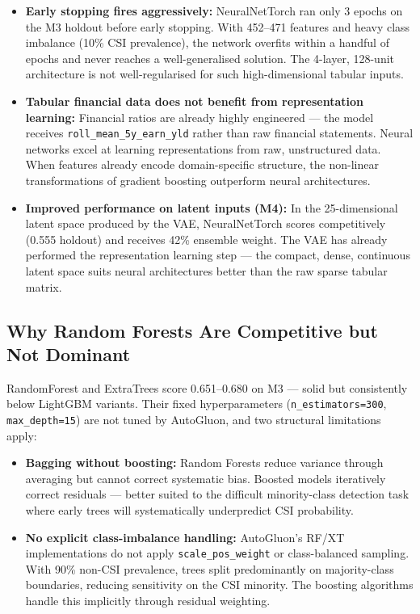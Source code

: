 \documentclass{report}\usepackage[]{graphicx}\usepackage[table]{xcolor}
\begin{document}
\begin{itemize}
    \item \textbf{Early stopping fires aggressively:} NeuralNetTorch ran only
    3 epochs on the M3 holdout before early stopping. With 452--471 features
    and heavy class imbalance (10\% CSI prevalence), the network overfits
    within a handful of epochs and never reaches a well-generalised solution.
    The 4-layer, 128-unit architecture is not well-regularised for such
    high-dimensional tabular inputs.

    \item \textbf{Tabular financial data does not benefit from representation learning:}
    Financial ratios are already highly engineered — the model receives
    \texttt{roll\_mean\_5y\_earn\_yld} rather than raw financial statements.
    Neural networks excel at learning representations from raw, unstructured data.
    When features already encode domain-specific structure, the non-linear
    transformations of gradient boosting outperform neural architectures.

    \item \textbf{Improved performance on latent inputs (M4):}
    In the 25-dimensional latent space produced by the VAE, NeuralNetTorch
    scores competitively (0.555 holdout) and receives 42\% ensemble weight.
    The VAE has already performed the representation learning step — the compact,
    dense, continuous latent space suits neural architectures better than
    the raw sparse tabular matrix.
\end{itemize}

\subsection{Why Random Forests Are Competitive but Not Dominant}

RandomForest and ExtraTrees score 0.651--0.680 on M3 — solid but consistently
below LightGBM variants. Their fixed hyperparameters (\texttt{n\_estimators=300},
\texttt{max\_depth=15}) are not tuned by AutoGluon, and two structural limitations apply:

\begin{itemize}
    \item \textbf{Bagging without boosting:} Random Forests reduce variance through
    averaging but cannot correct systematic bias. Boosted models iteratively
    correct residuals — better suited to the difficult minority-class detection
    task where early trees will systematically underpredict CSI probability.

    \item \textbf{No explicit class-imbalance handling:}
    AutoGluon's RF/XT implementations do not apply \texttt{scale\_pos\_weight}
    or class-balanced sampling. With 90\% non-CSI prevalence, trees split
    predominantly on majority-class boundaries, reducing sensitivity on the CSI minority.
    The boosting algorithms handle this implicitly through residual weighting.
\end{itemize}
\end{document}
